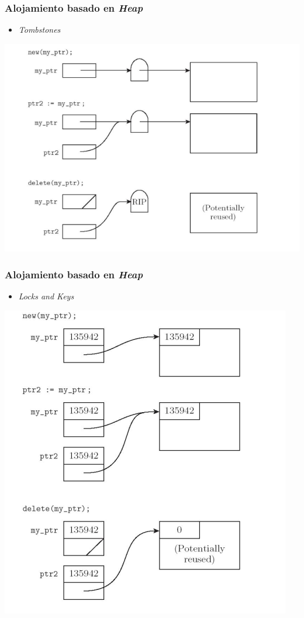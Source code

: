 \documentclass[11pt]{article}
\begin{document}
\subsubsection*{Alojamiento basado en \emph{Heap}}
\label{sec:orgheadline13}
\begin{itemize}
\item \emph{Tombstones}
\end{itemize}

\includegraphics[width=.9\linewidth]{tombstones.png}

\subsubsection*{Alojamiento basado en \emph{Heap}}
\label{sec:orgheadline14}
\begin{itemize}
\item \emph{Locks and Keys}
\end{itemize}

\includegraphics[width=.9\linewidth]{lockskeys.png}
\end{document}
